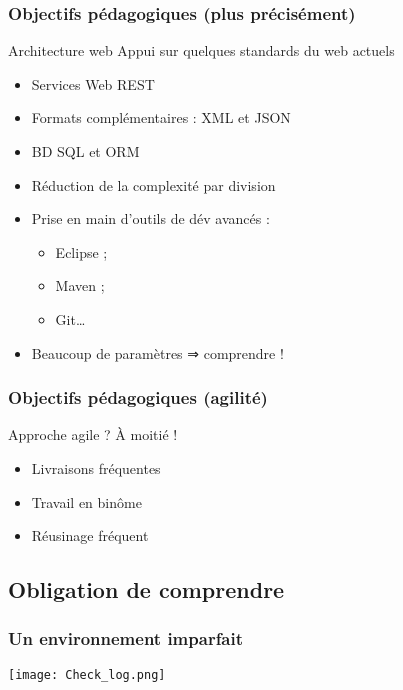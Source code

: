 \documentclass[english, french]{beamer}
\begin{document}
\begin{frame}
	\frametitle{Objectifs pédagogiques (plus précisément)}
	\begin{block}{Architecture web}
		Appui sur quelques standards du web actuels
		\begin{itemize}
			\item Services Web REST
			\item Formats complémentaires : XML et JSON
			\item BD SQL et ORM
			\item Réduction de la complexité par division
		\end{itemize}
	\end{block}
	\begin{itemize}
		\item Prise en main d’outils de dév avancés : 
		\begin{itemize}
			\item Eclipse ;
			\item Maven ;
			\item Git…
		\end{itemize}
		\item Beaucoup de paramètres ⇒ comprendre !
	\end{itemize}
\end{frame}

\begin{frame}
	\frametitle{Objectifs pédagogiques (agilité)}
	Approche agile ? À moitié !
	\begin{itemize}
		\item Livraisons fréquentes
		\item Travail en binôme
		\item Réusinage fréquent
	\end{itemize}
\end{frame}

\subsection{Obligation de comprendre}
\begin{frame}[fragile]
	\frametitle{Un environnement imparfait}
	\begin{minipage}{\columnwidth+15mm}
	\hspace{-8mm}%
	\texttt{[image: Check\_log.png]}%
	\end{minipage}
\end{frame}
\end{document}
